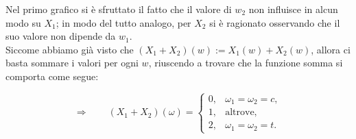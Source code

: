 \begin{esempio}
    Nel primo grafico si è sfruttato il fatto che il valore di $w_2$ non influisce in alcun modo su $X_1$; in modo del tutto analogo, per $X_2$ si è ragionato osservando che il suo valore non dipende da $w_1$.\\
    Siccome abbiamo già visto che $(X_1 +X_2)(w) := X_1(w) + X_2(w)$, allora ci basta sommare i valori per ogni $w$, riuscendo a trovare che la funzione somma si comporta come segue:
\begin{figure}[H]
\centering

\begin{minipage}{0.4\textwidth}
\centering
{}
\end{minipage}%
\hspace{0cm}
\begin{minipage}{0.5\textwidth}
\centering
\[
\Rightarrow\qquad 
(X_1 + X_2)(\omega) =
\begin{cases}
    0, & \omega_1 = \omega_2 = c,\\[4pt]
    1, & \text{altrove},\\[4pt]
    2, & \omega_1 = \omega_2 = t.
\end{cases}
\]
\end{minipage}
\end{figure}


\end{esempio}
